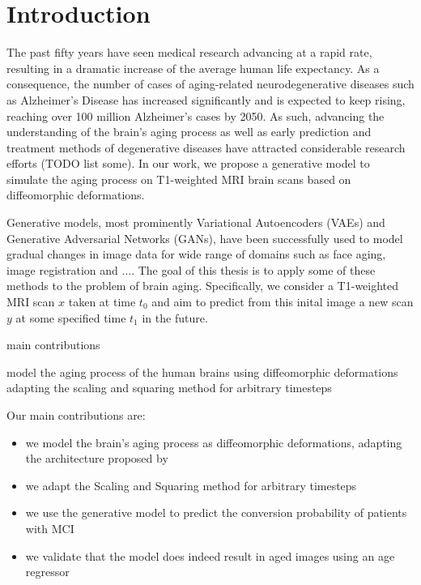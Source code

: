 \chapter{Introduction}




The past fifty years have seen medical research advancing at a rapid rate, resulting in a dramatic increase of the average human life expectancy. As a consequence, the number of cases of aging-related neurodegenerative diseases such as Alzheimer's Disease has increased significantly and is expected to keep rising, reaching over 100 million Alzheimer's cases by 2050. As such, advancing the understanding of the brain's aging process as well as early prediction and treatment methods of degenerative diseases have attracted considerable research efforts (TODO list some). In our work, we propose a generative model to simulate the aging process on T1-weighted MRI brain scans based on diffeomorphic deformations.

 

Generative models, most prominently Variational Autoencoders (VAEs) and Generative Adversarial Networks (GANs), have been successfully used to model gradual changes in image data for wide range of domains such as face aging, image registration and .... The goal of this thesis is to apply some of these methods to the problem of brain aging. Specifically, we consider a T1-weighted MRI scan $x$ taken at time $t_0$ and aim to predict from this inital image a new scan $y$ at some specified time $t_1$ in the future. 





main contributions

model the aging process of the human brains using diffeomorphic deformations
adapting the scaling and squaring method for arbitrary timesteps

Our main contributions are:

\begin{itemize}
	\item we model the brain's aging process as diffeomorphic deformations, adapting the architecture proposed by \cite{voxelmorph}
	\item we adapt the Scaling and Squaring method for arbitrary timesteps

	\item we use the generative model to predict the conversion probability of patients with MCI

	\item we validate that the model does indeed result in aged images using an age regressor


\end{itemize}
